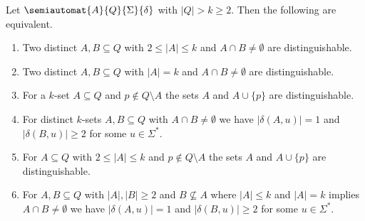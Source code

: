 \begin{proposition} \label{aut-syncw:subset:prop:kplusone}
	Let $\semiautomat{A}{Q}{\Sigma}{\delta}$ with $|Q| > k \ge 2$. Then the following are equivalent.	
	\begin{enumerate}		
		\item  \label{aut-syncw:subset:prop:kplusone:1}  Two distinct $A,B \subseteq Q$ with $2 \le |A| \le k$ and $A \cap B \ne \emptyset$ are distinguishable.		
		
		\item  \label{aut-syncw:subset:prop:kplusone:2} Two distinct $A,B \subseteq Q$ with $|A| = k$ and $A \cap B \ne \emptyset$ are distinguishable.
		
		\item  \label{aut-syncw:subset:prop:kplusone:3} For a $k$-set $A \subseteq Q$ and $p \notin Q \setminus A$ the sets $A$ and $A \cup \{p\}$ are distinguishable.
		
		\item  \label{aut-syncw:subset:prop:kplusone:4} For distinct $k$-sets $A,B \subseteq Q$ with $A \cap B \ne \emptyset$ we have $|\delta(A, u)| = 1$ and $|\delta(B, u)| \ge 2$ for some $u \in \Sigma^*$.
		
		\item  \label{aut-syncw:subset:prop:kplusone:5} For $A \subseteq Q$ with $2 \le |A| \le k$ and $p \notin Q \setminus A$ the sets $A$ and $A \cup \{p\}$ are distinguishable.
				
		\item  \label{aut-syncw:subset:prop:kplusone:6} For $A,B \subseteq Q$ with $|A|,|B| \ge 2$ and $B\not\subseteq A$
		where $|A| \le k$ and $|A| = k$ implies $A \cap B \ne \emptyset$
		we have $|\delta(A, u)| = 1$ and $|\delta(B, u)| \ge 2$ for some $u \in \Sigma^*$.		
	\end{enumerate}
\end{proposition}
